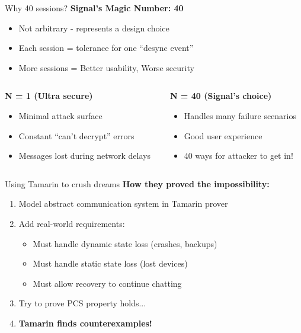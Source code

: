 \documentclass[aspectratio=169, lualatex, handout]{beamer}
\begin{document}
\begin{frame}{Why 40 sessions?}
	\textbf{Signal's Magic Number: 40}
	\begin{itemize}
		\item Not arbitrary - represents a design choice
		\item Each session = tolerance for one ``desync event''
		\item More sessions = Better usability, Worse security
	\end{itemize}
	\begin{columns}[c]
		\begin{column}{0.5\textwidth}
			\textbf{N = 1 (Ultra secure)}
			\begin{itemize}
				\item Minimal attack surface
				\item Constant ``can't decrypt'' errors
				\item Messages lost during network delays
			\end{itemize}
		\end{column}
		\begin{column}{0.5\textwidth}
			\textbf{N = 40 (Signal's choice)}
			\begin{itemize}
				\item Handles many failure scenarios
				\item Good user experience
				\item 40 ways for attacker to get in!
			\end{itemize}
		\end{column}
	\end{columns}
\end{frame}

\begin{frame}{Using Tamarin to crush dreams}
	\textbf{How they proved the impossibility:}
	\begin{enumerate}
		\item Model abstract communication system in Tamarin prover
		\item Add real-world requirements:
		      \begin{itemize}
			      \item Must handle dynamic state loss (crashes, backups)
			      \item Must handle static state loss (lost devices)
			      \item Must allow recovery to continue chatting
		      \end{itemize}
		\item Try to prove PCS property holds...
		\item \textbf{Tamarin finds counterexamples!}
	\end{enumerate}
\end{frame}
\end{document}
